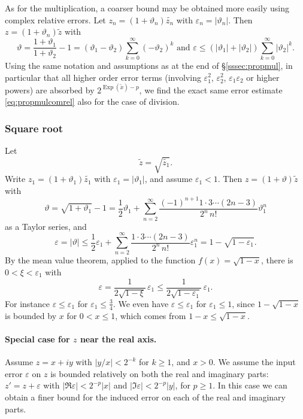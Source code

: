 \documentclass [11pt]{article}
\newcommand {\corr}[1]{{#1}}
\newcommand {\appro}[1]{\widetilde {#1}}
\DeclareMathOperator{\Exp}{\operatorname {Exp}}
\renewcommand {\epsilon}{\varepsilon}
\renewcommand {\theta}{\vartheta}
\renewcommand {\leq}{\leqslant}
\begin{document}
As for the multiplication, a coarser
bound may be obtained more easily using complex relative errors.
Let $\corr {z_n} = (1 + \theta_n) \appro {z_n}$ with
$\epsilon_n = | \theta_n |$. Then $\corr z = (1 + \theta_n) \appro z$
with
\[
\theta = \frac {1 + \theta_1}{1 + \theta_2} - 1
= (\theta_1 - \theta_2) \sum_{k = 0}^\infty (- \theta_2)^k
\text { and }
\epsilon \leq (|\theta_1| + |\theta_2|) \sum_{k = 0}^\infty |\theta_2|^k.
\]
Using the same notation and assumptions as at the end of
\S\ref {sssec:propmul}, in particular that all higher order error terms
(involving $\epsilon_1^2$, $\epsilon_2^2$, $\epsilon_1 \epsilon_2$
or higher powers) are absorbed by $2^{\Exp (\appro x) - p}$,
we find the exact same error estimate \eqref {eq:propmulcomrel}
also for the case of division.


\subsubsection {Square root}
Let
\[
\appro z = \sqrt {\appro {z_1}}.
\]
Write $\corr {z_1} = (1 + \theta_1) \appro {z_1}$ with
$\epsilon_1 = |\theta_1|$, and assume $\epsilon_1 < 1$.
Then $\corr z = (1 + \theta) \appro z$ with
\[
\theta = \sqrt {1 + \theta_1} - 1
= \frac {1}{2} \theta_1
+ \sum_{n=2}^\infty \frac {(-1)^{n+1} 1 \cdot 3 \cdots (2 n - 3)}{2^n \, n!}
   \theta_1^n
\]
as a Taylor series, and
\[
\epsilon = |\theta|
\leq
\frac {1}{2}  \epsilon_1
+ \sum_{n=2}^\infty \frac {1 \cdot 3 \cdots (2 n - 3)}{2^n \, n!}
\epsilon_1^n
= 1 - \sqrt {1 - \epsilon_1}.
\]
By the mean value theorem, applied to the function $f (x) = \sqrt {1 - x}$,
there is $0 < \xi < \epsilon_1$ with
\begin {equation}
\label {eq:propsqrt}
\epsilon = \frac {1}{2 \sqrt {1 - \xi}} \, \epsilon_1
\leq \frac {1}{2 \sqrt {1 - \epsilon_1}} \, \epsilon_1.
\end {equation}
For instance $\epsilon \leq \epsilon_1$ for $\epsilon_1 \leq \frac {3}{4}$.
We even have $\epsilon \leq \epsilon_1$ for $\epsilon_1 \leq 1$,
since $1 - \sqrt{1-x}$ is bounded by $x$
for $0 < x \leq 1$, which comes from $1 - x \leq \sqrt{1-x}$.

\paragraph{Special case for $z$ near the real axis.}
Assume $z = x + iy$ with $|y/x| < 2^{-k}$ for $k \ge 1$, and $x > 0$.
We assume the input error $\epsilon$ on $z$ is bounded relatively
on both the real and imaginary parts:
$z' = z + \epsilon$ with $|\Re \epsilon| < 2^{-p} |x|$ and
$|\Im \epsilon| < 2^{-p} |y|$, for $p \ge 1$.
In this case we can obtain a finer bound for the induced error
on each of the real and imaginary parts.
\end{document}
